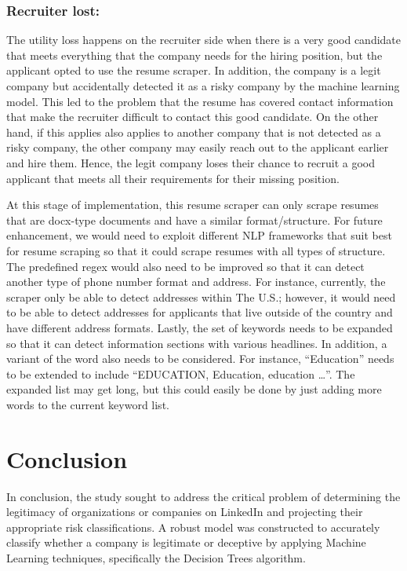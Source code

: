 \documentclass{article}
\begin{document}
\subsubsection{Recruiter lost:  }
The utility loss happens on the recruiter side when there is a very good candidate that meets everything that the company needs for the hiring position, but the applicant opted to use the resume scraper.  In addition, the company is a legit company but accidentally detected it as a risky company by the machine learning model. This led to the problem that the resume has covered contact information that make the recruiter difficult to contact this good candidate. On the other hand, if this applies also applies to another company that is not detected as a risky company, the other company may easily reach out to the applicant earlier and hire them. Hence, the legit company loses their chance to recruit a good applicant that meets all their requirements for their missing position.
	
At this stage of implementation, this resume scraper can only scrape resumes that are docx-type documents and have a similar format/structure. For future enhancement, we would need to exploit different NLP frameworks that suit best for resume scraping so that it could scrape resumes with all types of structure. The predefined regex would also need to be improved so that it can detect another type of phone number format and address. For instance, currently, the scraper only be able to detect addresses within The U.S.; however, it would need to be able to detect addresses for applicants that live outside of the country and have different address formats. Lastly, the set of keywords needs to be expanded so that it can detect information sections with various headlines. In addition, a variant of the word also needs to be considered. For instance, “Education” needs to be extended to include “EDUCATION, Education, education …”. The expanded list may get long, but this could easily be done by just adding more words to the current keyword list.








\section{Conclusion}
In conclusion, the study sought to address the critical problem of determining the legitimacy of organizations or companies on LinkedIn and projecting their appropriate risk classifications. A robust model was constructed to accurately classify whether a company is legitimate or deceptive by applying Machine Learning techniques, specifically the Decision Trees algorithm.
\end{document}
